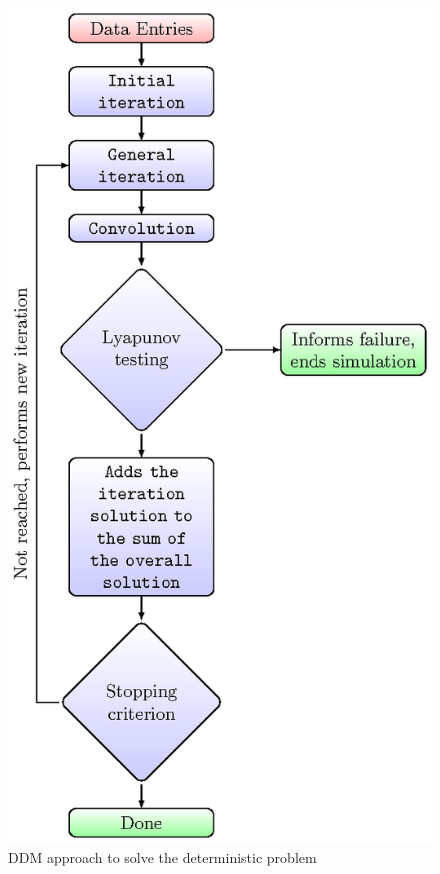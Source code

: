 \documentclass[preprint,12pt,authoryear]{elsarticle}
\begin{document}
\begin{figure}[H]
 \centering
 \includegraphics[scale=1]{fig1.eps} 
\caption{\footnotesize{DDM approach to solve the deterministic problem}}\label{fig1}
\end{figure}
\end{document}
